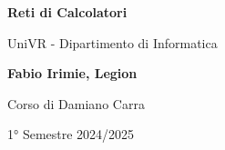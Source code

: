 \begin{titlepage}
	\begin{center}
		\vspace*{1cm}

		\Huge
    \textbf{Reti di Calcolatori}

		\vspace{0.5cm}
		\LARGE
		UniVR - Dipartimento di Informatica

		\vspace{1.5cm}

		\textbf{Fabio Irimie, Legion}

		\vfill


		\vspace{0.8cm}

    Corso di Damiano Carra

		1° Semestre 2024/2025

	\end{center}
\end{titlepage}
